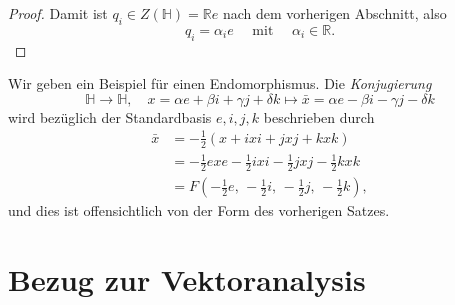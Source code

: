 \documentclass[aspectratio=169]{beamer}
\newcommand{\Ham}{\ensuremath{\mathbb{H}}{ }}
\newcommand{\R}{\ensuremath{\mathbb{R}}{ }}
\newcommand{\half}{\frac{1}{2}}
\begin{document}
\begin{frame}
\begin{proof}
{                Damit ist \(q_i \in Z(\Ham) = \R e\) nach dem vorherigen Abschnitt, also
                \[
                    q_i = \alpha_i e \quad \text{ mit } \quad \alpha_i \in \R
                .\] 
            }
        \end{proof}
    \end{frame}

    \begin{frame}
        Wir geben ein Beispiel für einen Endomorphismus.
        Die \emph{Konjugierung}
        \[
            \Ham \to \Ham, \quad
            x = \alpha e + \beta i + \gamma j + \delta k \mapsto \bar{x} = \alpha e - \beta i - \gamma j - \delta k
        \]
        wird bezüglich der Standardbasis \(e, i, j, k\) beschrieben durch
        \begin{align*}
            \bar{x} &= - \half \left( x + ixi + jxj + kxk \right) \\
                    &= - \half exe - \half ixi - \half jxj - \half kxk \\
                    &= F \left( - \half e, \, - \half i, \, - \half j, \, - \half k \right),
        \end{align*}
        und dies ist offensichtlich von der Form des vorherigen Satzes.
    \end{frame}

    \section{Bezug zur Vektoranalysis}
\end{document}
